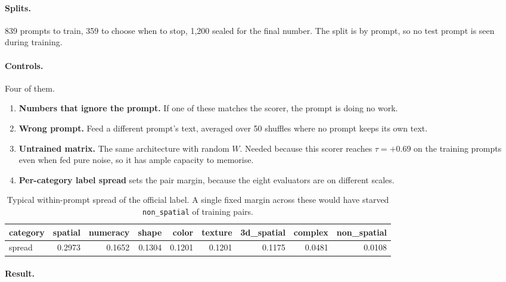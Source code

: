 \documentclass[11pt]{article}
\begin{document}
\paragraph{Splits.} 839 prompts to train, 359 to choose when to stop, 1{,}200 sealed for the final
number. The split is by prompt, so no test prompt is seen during training.

\paragraph{Controls.} Four of them.

\begin{enumerate}
  \item \textbf{Numbers that ignore the prompt.} If one of these matches the scorer, the prompt is
        doing no work.
  \item \textbf{Wrong prompt.} Feed a different prompt's text, averaged over 50 shuffles where no
        prompt keeps its own text.
  \item \textbf{Untrained matrix.} The same architecture with random $W$. Needed because this scorer
        reaches $\tau = +0.69$ on the training prompts even when fed pure noise, so it has ample
        capacity to memorise.
  \item \textbf{Per-category label spread} sets the pair margin, because the eight evaluators are on
        different scales.
\end{enumerate}

\begin{table}[h]
\centering
\caption{Typical within-prompt spread of the official label. A single fixed margin across these
would have starved \texttt{non\_spatial} of training pairs.}
\begin{tabular}{@{}lrrrrrrrr@{}}
\toprule
category & spatial & numeracy & shape & color & texture & 3d\_spatial & complex & non\_spatial \\
\midrule
spread & 0.2973 & 0.1652 & 0.1304 & 0.1201 & 0.1201 & 0.1175 & 0.0481 & 0.0108 \\
\bottomrule
\end{tabular}
\end{table}

\paragraph{Result.}
\end{document}
